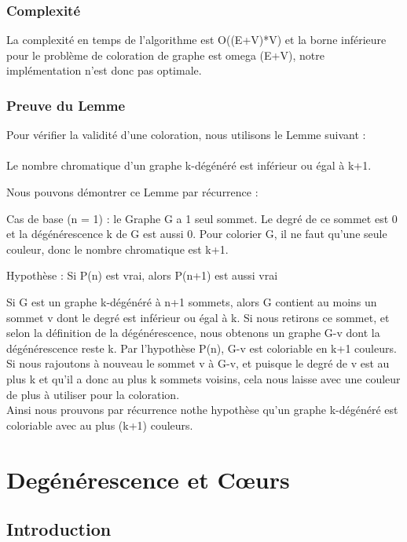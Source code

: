 \subsubsection{Complexité}

La complexité en temps de l'algorithme est O((E+V)*V) et la borne inférieure pour le problème de coloration de graphe est omega \Omega(E+V), notre implémentation n'est donc pas optimale.

\subsubsection{Preuve du Lemme}

Pour vérifier la validité d'une coloration, nous utilisons le Lemme suivant : \\
\\
Le nombre chromatique d'un graphe k-dégénéré est inférieur ou égal à k+1.

Nous pouvons démontrer ce Lemme par récurrence :

Cas de base (n = 1) : le Graphe G a 1 seul sommet. Le degré de ce sommet est 0 et la dégénérescence k de G est aussi 0. Pour colorier G, il ne faut qu'une seule couleur, donc le nombre chromatique est k+1.

Hypothèse : Si P(n) est vrai, alors P(n+1) est aussi vrai

Si G est un graphe k-dégénéré à n+1 sommets, alors G contient au moins un sommet v dont le degré est inférieur ou égal à k. Si nous retirons ce sommet, et selon la définition de la dégénérescence, nous obtenons un graphe G-v dont la dégénérescence reste k. Par l'hypothèse P(n), G-v est coloriable en k+1 couleurs. \\ Si nous rajoutons à nouveau le sommet v à G-v, et puisque le degré de v est au plus k et qu'il a donc au plus k sommets voisins, cela nous laisse avec une couleur de plus à utiliser pour la coloration. \\
Ainsi nous prouvons par récurrence nothe hypothèse qu'un graphe k-dégénéré est coloriable avec au plus (k+1) couleurs.



\newpage

\section{Degénérescence et Cœurs }
\subsection{Introduction}
\label{sec:Degenerescence_et_Cœurs_introduction}

